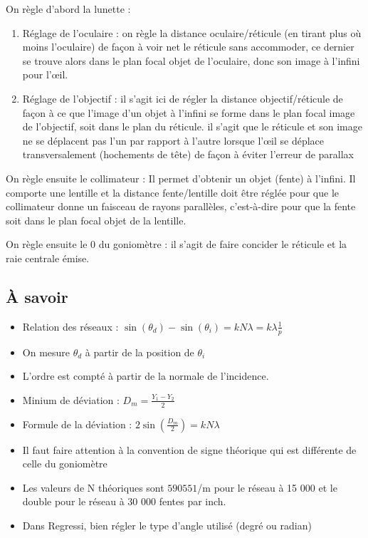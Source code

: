 \documentclass[french]{yLectureNote}
\begin{document}
On règle d'abord la lunette :
\begin{enumerate}
 \item {\color{criticalColor}Réglage de l'oculaire} : on règle la distance oculaire/réticule (en tirant plus où moins l’oculaire) de façon à voir net le
réticule sans accommoder, ce dernier se trouve alors dans le plan focal objet de l'oculaire, donc son image à l’infini pour l’œil.
\item {\color{warningColor}Réglage de l'objectif} : il s’agit ici de régler la distance objectif/réticule de façon à ce que l'image d'un objet à l'infini se
forme dans le plan focal image de l'objectif, soit dans le plan du réticule. il s’agit que le réticule et son image ne se déplacent pas l'un par rapport à l'autre lorsque
l'œil se déplace transversalement (hochements de tête) de façon à éviter l'erreur de parallax
\end{enumerate}
On règle ensuite le {\color{informationColor}collimateur} : Il permet d'obtenir un objet (fente) à l'infini.
Il comporte une lentille et la distance
fente/lentille doit être réglée pour
que le collimateur donne un faisceau de
rayons parallèles, c'est-à-dire pour que la
fente soit dans le plan focal objet de la
lentille.

On règle ensuite le 0 du goniomètre : il s'agit de faire concider le réticule et la raie centrale émise.
\subsection{À savoir}
\begin{itemize}
 \item Relation des réseaux : \(\sin(\theta_d)-\sin(\theta_i) = kN\lambda = k\lambda\frac{1}{p}\)
 \item On mesure \(\theta_d\) à partir de la position de \(\theta_i\)
 \item L'ordre est compté à partir de la normale de l'incidence.
 \item Minium de déviation : \(D_m = \frac{Y_1-Y_2}{2}\)
 \item Formule de la déviation : \(2\sin(\frac{D_m}{2}) = kN\lambda\)
 \item Il faut faire attention à la convention de signe théorique qui est différente de celle du goniomètre
 \item Les valeurs de N théoriques sont \( 590 551\)/m pour le réseau  à 15 000 et le double pour le réseau à 30 000 fentes par inch.
 \item Dans Regressi, bien régler le type d'angle utilisé (degré ou radian)
\end{itemize}


 
\end{document}
